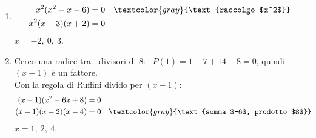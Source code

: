\begin{question}[ID=4.4, subtitle={Equazioni di grado superiore al secondo}, difficulty=media, tags={equazioni di grado superiore}]
\begin{explanation}
\begin{enumerate}
\[\begin{aligned}
    \end{aligned}\]
    $x=0,\ 1,\ 3$.
    \item \[\begin{aligned}
    x^2(x^2-x-6) &= 0 && \textcolor{gray}{\text{raccolgo $x^2$}}\\
    x^2(x-3)(x+2) &= 0
    \end{aligned}\]
    $x=-2,\ 0,\ 3$.
    \item Cerco una radice tra i divisori di $8$: \ $P(1)=1-7+14-8=0$, quindi $(x-1)$ è un fattore. \\
    Con la regola di Ruffini divido per $(x-1)$:
    \[\begin{aligned}
    (x-1)(x^2-6x+8) &= 0\\
    (x-1)(x-2)(x-4) &= 0 && \textcolor{gray}{\text{somma $-6$, prodotto $8$}}
    \end{aligned}\]
    $x=1,\ 2,\ 4$.
\end{enumerate}
\end{explanation}
\end{question}


